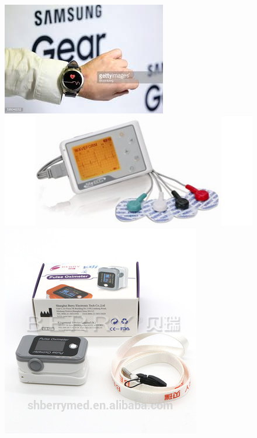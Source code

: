 \begin{figure}[H]
    \centering
	\includegraphics[scale=0.4]{images/gears3.jpg}
	\includegraphics[scale=0.3]{images/ecg_1.jpg}	
	\includegraphics[scale=1]{images/ppg_clip.jpg}

\end{figure}
